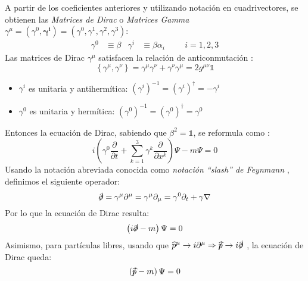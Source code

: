 A partir de los coeficientes anteriores y utilizando notación en cuadrivectores, se obtienen las \textit{Matrices de Dirac} o \textit{Matrices Gamma}  $\gamma^{\mu}=(\gamma^0, \boldsymbol{\gamma^{i}})=(\gamma^0, \gamma^1, \gamma^2, \gamma^3)$:
\begin{align}
\gamma ^0 &\equiv \beta & \gamma ^i &\equiv \beta \alpha_i \hspace{1cm} i=1, 2, 3 \label{eq:matricesDirac}
\end{align}
Las matrices de Dirac $\gamma^{\mu}$ satisfacen la relación de anticonmutación \cite{MCR}:
\begin{equation}
\left\{ \gamma ^{\mu },\gamma ^{\nu }\right\} =\gamma ^{\mu }\gamma ^{\nu }+\gamma ^{\nu }\gamma ^{\mu }=2g^{\mu \nu }\mathbb{1}\label{eq:anticomm_relation}
\end{equation}
\begin{itemize}
\item $\gamma^{i}$ es unitaria y antihermítica: $\left( \gamma ^{i}\right) ^{-1}=\left( \gamma ^{i}\right) ^{\dagger}=-\gamma ^{i}$
\item $\gamma^{0}$ es unitaria y hermítica: $\left( \gamma ^{0}\right) ^{-1}=\left( \gamma ^{0}\right) ^{\dagger}=\gamma ^{0}$
\end{itemize}

Entonces la ecuación de Dirac, sabiendo que $\beta^2=\mathbb{1}$, se reformula como \cite{MCR}:
\begin{equation}
i\left( \gamma ^{0}\dfrac{\partial }{\partial t}+\sum ^{3}_{k=1}\gamma ^{k}\dfrac{\partial }{\partial x^{k}}\right) \Psi -m\Psi =0\label{eq:ecDirac_cov}
\end{equation}
Usando la notación abreviada conocida como \textit{notación ``slash'' de Feynmann} \cite{MCR}, definimos el siguiente operador:
\begin{equation}
\slashed{\partial}=\gamma ^{\mu }\partial ^{\mu }=\gamma ^{\mu }\partial _{\mu }=\gamma ^{0}\partial _{t}+\gamma \nabla
\end{equation}
Por lo que la ecuación de Dirac resulta:
\begin{equation}
\left(i \slashed{\partial}-m\right) \Psi =0\label{eq:Dirac_final}
\end{equation}
Asimismo, para partículas libres, usando que $\widehat{p}^{\mu} \rightarrow i\partial^{\mu} \Rightarrow \slashed{\widehat{p}} \rightarrow i\slashed{\partial}$ \cite{MCR}, la ecuación de Dirac queda:
\begin{equation}
\left( \slashed{\widehat{p}}-m\right) \Psi =0\label{eq:Dirac_free}
\end{equation}

